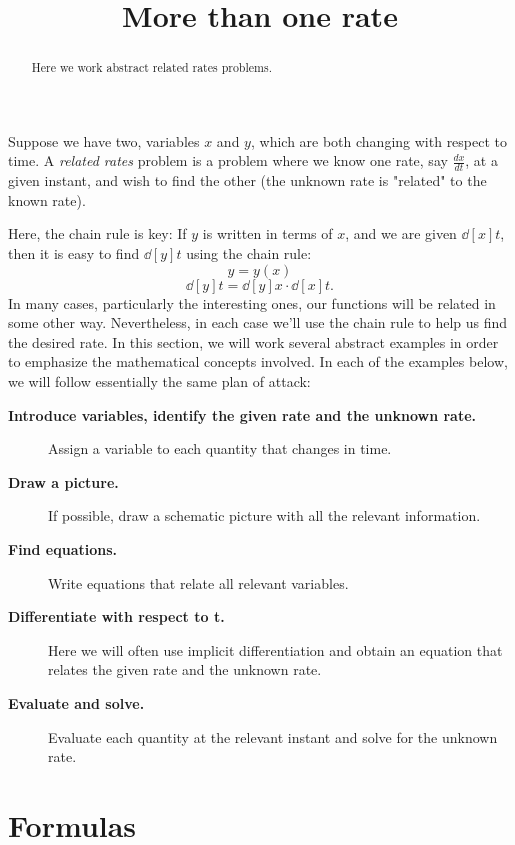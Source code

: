 \documentclass{ximera}
\title[Dig-In:]{More than one rate}
\begin{document}
	\begin{abstract}
		Here we work abstract related rates problems.
	\end{abstract}
	\maketitle
	
	
	Suppose we have two, variables $x$ and $y$, which are both changing with
	respect to time.  A \textit{related rates} problem is a problem where
	we know one rate, say $\frac{dx}{dt}$, at a given instant, and wish to find the other (the unknown rate is "related" to the known rate).
	
	Here, the chain rule is key: If $y$ is written in terms of $x$, and we
	are given $\dd[x]{t}$, then it is easy to find $\dd[y]{t}$ using the
	chain rule:
	\[
	y=y(x)
	\]
	\[
	\dd[y]{t}=\dd[y]{x}\cdot \dd[x]{t}.
	\]
	In many cases, particularly the interesting ones, our functions will
	be related in some other way. Nevertheless, in each case we'll use the
	chain rule to help us find the desired rate. In this
	section, we will work several abstract examples in order to emphasize
	the mathematical concepts involved. In each of the examples below, we
	will follow essentially the same plan of attack:
	
	
	
	\begin{description}
		\item[\textbf{Introduce variables, identify the given rate and the unknown rate.}]
		
		Assign a variable to each quantity that changes in time.
		\item[\textbf{Draw a picture.}] If possible, draw a schematic picture with all the relevant information. 
		\item[\textbf{Find equations.}] Write equations that relate all
		relevant variables.
		\item[\textbf{Differentiate with respect to t.}] Here we will often use
		implicit differentiation and obtain an equation that relates the given rate and the unknown rate. 
		\item[\textbf{Evaluate and solve.}] Evaluate
		each quantity at the relevant instant and solve for the unknown rate.
		
	\end{description}
	
	
	
	
	\section{Formulas}
	
\end{document}
